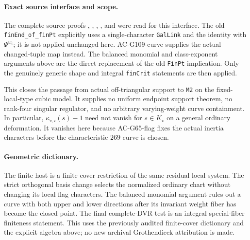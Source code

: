 \paragraph{Exact source interface and scope.}
The complete source proofs ,
, ,
, and
 were read
for this interface.  The old \texttt{finEnd\_of\_finPt} explicitly
uses a single-character \texttt{GalLink} and the identity with
\(\Psi^{w_i}\); it is not applied unchanged here.
AC-G109-curve supplies the actual changed-tuple map instead.
The balanced monomial and class-exponent arguments above are
the direct replacement of the old \texttt{FinPt} implication.
Only the genuinely generic shape and integral \texttt{finCrit}
statements are then applied.

This closes the passage from actual off-triangular support to
\texttt{M2} on the fixed-local-type cubic model.  It supplies no
uniform endpoint support theorem, no rank-four singular regulator,
and no arbitrary varying-weight curve containment.  In particular,
\(\kappa_{v,i}(s)-1\) need not vanish for \(s\in K_v\) on a
general ordinary deformation.  It vanishes here because
AC-G65-flag fixes the actual inertia characters before the
characteristic-\(269\) curve is chosen.

\paragraph{Geometric dictionary.}
The finite host is a finite-cover restriction of the same residual
local system.  The strict orthogonal basis change selects the
normalized ordinary chart without changing its local flag
characters.  The balanced monomial argument rules out a curve
with both upper and lower directions after its invariant weight
fiber has become the closed point.  The final complete-DVR test
is an integral special-fiber finiteness statement.  This uses the
previously audited finite-cover dictionary and the explicit
algebra above; no new archival Grothendieck attribution is made.
